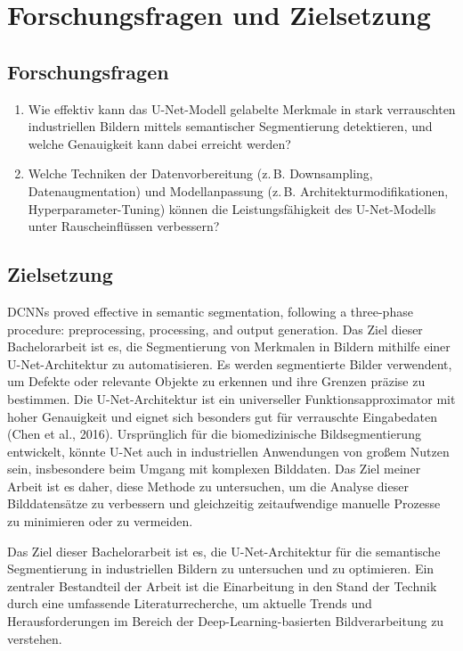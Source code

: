 \chapter{Forschungsfragen und Zielsetzung}\label{sec:exp_ziel}
\section{Forschungsfragen}
\begin{enumerate}
    \item Wie effektiv kann das U-Net-Modell gelabelte Merkmale in stark verrauschten industriellen Bildern mittels semantischer Segmentierung detektieren, und welche Genauigkeit kann dabei erreicht werden?
    \item Welche Techniken der Datenvorbereitung (z. B. Downsampling, Datenaugmentation) und Modellanpassung (z. B. Architekturmodifikationen, Hyperparameter-Tuning) können die Leistungsfähigkeit des U-Net-Modells unter Rauscheinflüssen verbessern?
\end{enumerate}

\section{Zielsetzung}
DCNNs proved effective in semantic segmentation, following a three-phase procedure: preprocessing, processing, and output generation.\cite{manakitsa_review_2024}
Das Ziel dieser Bachelorarbeit ist es, die Segmentierung von Merkmalen in Bildern mithilfe einer U-Net-Architektur zu automatisieren. Es werden segmentierte Bilder verwendent, um Defekte oder relevante Objekte zu erkennen und ihre Grenzen präzise zu bestimmen. Die U-Net-Architektur ist ein universeller Funktionsapproximator mit hoher Genauigkeit und eignet sich besonders gut für verrauschte Eingabedaten (Chen et al., 2016). Ursprünglich für die biomedizinische Bildsegmentierung entwickelt, könnte U-Net auch in industriellen Anwendungen von großem Nutzen sein, insbesondere beim Umgang mit komplexen Bilddaten. Das Ziel meiner Arbeit ist es daher, diese Methode zu untersuchen, um die Analyse dieser Bilddatensätze zu verbessern und gleichzeitig zeitaufwendige manuelle Prozesse zu minimieren oder zu vermeiden.


Das Ziel dieser Bachelorarbeit ist es, die U-Net-Architektur für die semantische Segmentierung in industriellen Bildern zu untersuchen und zu optimieren. Ein zentraler Bestandteil der Arbeit ist die Einarbeitung in den Stand der Technik durch eine umfassende Literaturrecherche, um aktuelle Trends und Herausforderungen im Bereich der Deep-Learning-basierten Bildverarbeitung zu verstehen.

